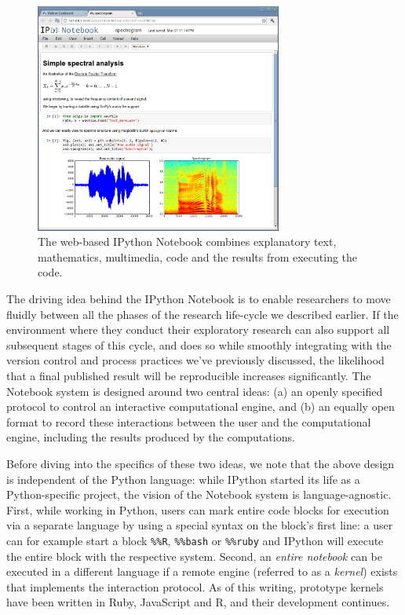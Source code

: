 \documentclass[ChapterTOCs,krantz2]{krantz} %
\begin{document}
\begin{figure}
  \begin{centering}
    \includegraphics[width=3.2in]{fig/ipython-notebook-specgram.png}\par
  \end{centering}

  \caption{\label{fig:IPython-notebook}The web-based IPython Notebook combines
    explanatory text, mathematics, multimedia, code and the results from
    executing the code.}
\end{figure}

The driving idea behind the IPython Notebook is to enable researchers to move
fluidly between all the phases of the research life-cycle we described earlier.
If the environment where they conduct their exploratory research can also
support all subsequent stages of this cycle, and does so while smoothly
integrating with the version control and process practices we've previously
discussed, the likelihood that a final published result will be reproducible
increases significantly.  The Notebook system is designed around two central
ideas: (a) an openly specified protocol to control an interactive computational
engine, and (b) an equally open format to record these interactions between the
user and the computational engine, including the results produced by the
computations.

Before diving into the specifics of these two ideas, we note that the above
design is independent of the Python language: while IPython started its life as
a Python-specific project, the vision of the Notebook system is
language-agnostic.  First, while working in Python, users can mark entire code
blocks for execution via a separate language by using a special syntax on the
block's first line: a user can for example start a block \texttt{\%\%R},
\texttt{\%\%bash} or \texttt{\%\%ruby} and IPython will execute the entire
block with the respective system.  Second, an \emph{entire notebook} can be
executed in a different language if a remote engine (referred to as a
\emph{kernel}) exists that implements the interaction protocol.  As of this
writing, prototype kernels have been written in Ruby, JavaScript and R, and
their development continues.
\end{document}
